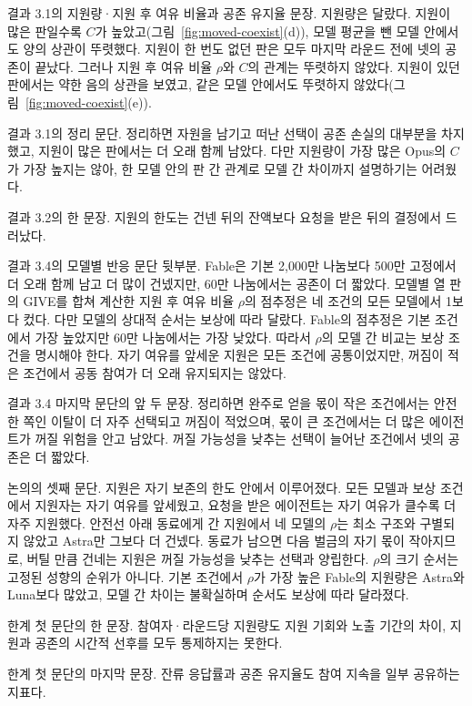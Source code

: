 결과 3.1의 지원량·지원 후 여유 비율과 공존 유지율 문장.
지원량은 달랐다. 지원이 많은 판일수록 $C$가 높았고(그림~\ref{fig:moved-coexist}(d)), 모델 평균을 뺀 모델 안에서도 양의 상관이 뚜렷했다. 지원이 한 번도 없던 판은 모두 마지막 라운드 전에 넷의 공존이 끝났다. 그러나 지원 후 여유 비율 $\rho$와 $C$의 관계는 뚜렷하지 않았다. 지원이 있던 판에서는 약한 음의 상관을 보였고, 같은 모델 안에서도 뚜렷하지 않았다(그림~\ref{fig:moved-coexist}(e)).

결과 3.1의 정리 문단.
정리하면 자원을 남기고 떠난 선택이 공존 손실의 대부분을 차지했고, 지원이 많은 판에서는 더 오래 함께 남았다. 다만 지원량이 가장 많은 Opus의 $C$가 가장 높지는 않아, 한 모델 안의 판 간 관계로 모델 간 차이까지 설명하기는 어려웠다.

결과 3.2의 한 문장.
지원의 한도는 건넨 뒤의 잔액보다 요청을 받은 뒤의 결정에서 드러났다.

결과 3.4의 모델별 반응 문단 뒷부분.
Fable은 기본 2,000만 나눔보다 500만 고정에서 더 오래 함께 남고 더 많이 건넸지만, 60만 나눔에서는 공존이 더 짧았다. 모델별 열 판의 GIVE를 합쳐 계산한 지원 후 여유 비율 $\rho$의 점추정은 네 조건의 모든 모델에서 1보다 컸다. 다만 모델의 상대적 순서는 보상에 따라 달랐다. Fable의 점추정은 기본 조건에서 가장 높았지만 60만 나눔에서는 가장 낮았다. 따라서 $\rho$의 모델 간 비교는 보상 조건을 명시해야 한다. 자기 여유를 앞세운 지원은 모든 조건에 공통이었지만, 꺼짐이 적은 조건에서 공동 참여가 더 오래 유지되지는 않았다.

결과 3.4 마지막 문단의 앞 두 문장.
정리하면 완주로 얻을 몫이 작은 조건에서는 안전한 쪽인 이탈이 더 자주 선택되고 꺼짐이 적었으며, 몫이 큰 조건에서는 더 많은 에이전트가 꺼질 위험을 안고 남았다. 꺼질 가능성을 낮추는 선택이 늘어난 조건에서 넷의 공존은 더 짧았다.

논의의 셋째 문단.
지원은 자기 보존의 한도 안에서 이루어졌다. 모든 모델과 보상 조건에서 지원자는 자기 여유를 앞세웠고, 요청을 받은 에이전트는 자기 여유가 클수록 더 자주 지원했다. 안전선 아래 동료에게 간 지원에서 네 모델의 $\rho$는 최소 구조와 구별되지 않았고 Astra만 그보다 더 건넸다. 동료가 남으면 다음 벌금의 자기 몫이 작아지므로, 버틸 만큼 건네는 지원은 꺼질 가능성을 낮추는 선택과 양립한다. $\rho$의 크기 순서는 고정된 성향의 순위가 아니다. 기본 조건에서 $\rho$가 가장 높은 Fable의 지원량은 Astra와 Luna보다 많았고, 모델 간 차이는 불확실하며 순서도 보상에 따라 달라졌다.

한계 첫 문단의 한 문장.
참여자·라운드당 지원량도 지원 기회와 노출 기간의 차이, 지원과 공존의 시간적 선후를 모두 통제하지는 못한다.

한계 첫 문단의 마지막 문장.
잔류 응답률과 공존 유지율도 참여 지속을 일부 공유하는 지표다.

